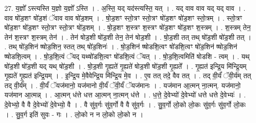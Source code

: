 \documentclass[17pt]{extarticle}
\begin{document}
27. य॒ज्ञो᳚ ऽस्त्यस्ति य॒ज्ञो य॒ज्ञो᳚ ऽस्ति । . अ॒स्ति॒ यद् यद॑स्त्यस्ति॒ यत् । . यद् वाव वाव यद् यद् वाव । . वाव षो॑ड॒शꣳ षो॑ड॒शं ॅवाव वाव षो॑ड॒शम् । . षो॒ड॒शꣳ स्तो॒त्रꣳ स्तो॒त्रꣳ षो॑ड॒शꣳ षो॑ड॒शꣳ स्तो॒त्रम् । . स्तो॒त्रꣳ षो॑ड॒शꣳ षो॑ड॒शꣳ स्तो॒त्रꣳ स्तो॒त्रꣳ षो॑ड॒शम् । . षो॒ड॒शꣳ श॒स्त्रꣳ श॒स्त्रꣳ षो॑ड॒शꣳ षो॑ड॒शꣳ श॒स्त्रम् । . श॒स्त्रम् तेन॒ तेन॑ श॒स्त्रꣳ श॒स्त्रम् तेन॑ । . तेन॑ षोड॒शी षो॑ड॒शी तेन॒ तेन॑ षोड॒शी । . षो॒ड॒शी तत् तथ् षो॑ड॒शी षो॑ड॒शी तत् । . तथ् षो॑ड॒शिन॑ ष्षोड॒शिन॒ स्तत् तथ् षो॑ड॒शिनः॑ । . षो॒ड॒शिन॑ ष्षोडशि॒त्वꣳ षो॑डशि॒त्वꣳ षो॑ड॒शिन॑ ष्षोड॒शिन॑ ष्षोडशि॒त्वम् । . षो॒ड॒शि॒त्वं ॅयद् यथ्षो॑डशि॒त्वꣳ षो॑डशि॒त्वं ॅयत् । . षो॒ड॒शि॒त्वमिति॑ षोडशि - त्वम् । . यथ् षो॑ड॒शी षो॑ड॒शी यद् यथ् षो॑ड॒शी । . षो॒ड॒शी गृ॒ह्यते॑ गृ॒ह्यते॑ षोड॒शी षो॑ड॒शी गृ॒ह्यते᳚ । . गृ॒ह्यत॑ इन्द्रि॒य मि॑न्द्रि॒यम् गृ॒ह्यते॑ गृ॒ह्यत॑ इन्द्रि॒यम् । . इ॒न्द्रि॒य मे॒वैवेन्द्रि॒य मि॑न्द्रि॒य मे॒व । . ए॒व तत् तदे॒ वैव तत् । . तद् वी॒र्यं॑ ॅवी॒र्य॑म् तत् तद् वी॒र्य᳚म् । . वी॒र्यं॑ ॅयज॑मानो॒ यज॑मानो वी॒र्यं॑ ॅवी॒र्यं॑ ॅयज॑मानः । . यज॑मान आ॒त्मन् ना॒त्मन्. यज॑मानो॒ यज॑मान आ॒त्मन्न् । . आ॒त्मन् ध॑त्ते धत्त आ॒त्मन् ना॒त्मन् ध॑त्ते । . ध॒त्ते॒ दे॒वेभ्यो॑ दे॒वेभ्यो॑ धत्ते धत्ते दे॒वेभ्यः॑ । . दे॒वेभ्यो॒ वै वै दे॒वेभ्यो॑ दे॒वेभ्यो॒ वै । . वै सु॑व॒र्गः सु॑व॒र्गो वै वै सु॑व॒र्गः । . सु॒व॒र्गो लो॒को लो॒कः सु॑व॒र्गः सु॑व॒र्गो लो॒कः । . सु॒व॒र्ग इति॑ सुवः - गः । . लो॒को न न लो॒को लो॒को न । \newline
\end{document}
